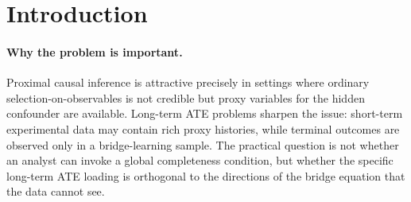 \documentclass[11pt]{article}
\theoremstyle{definition}
\theoremstyle{plain}
\theoremstyle{remark}
\begin{document}
\begin{abstract}
Proximal long-term treatment-effect analyses use negative-control proxies to
solve outcome-bridge equations, but standard point-identification statements
typically impose completeness or rank conditions that make the bridge unique.
Recent proximal work shows that the causal functional may remain identified even
when bridge functions are nonunique, while proxy partial-identification work
studies what happens after completeness is abandoned.  This proposal asks for
the sharp critical boundary between those regimes in a two-sample long-term ATE
setting.  The proposed focal object is the target-active null score
\(\alpha_{\mathrm{LT}}(P)\), the component of the experimental long-term ATE
loading that lies in the null space of the observed bridge operator.  The
headline conjecture is that \(\alpha_{\mathrm{LT}}(P)\) and a finite bridge-LP
support function yield both the exact point-identification frontier and a
local-to-incomplete phase diagram for regularized bridge estimators when the
smallest target-relevant singular values shrink.  If resolved, the result would
tell analysts when a weak or nonunique
proximal bridge still identifies the long-term ATE and when it must be reported
as a sharp proxy-sensitive interval.
\end{abstract}

\section{Introduction}
\paragraph{Why the problem is important.}
Proximal causal inference is attractive precisely in settings where ordinary
selection-on-observables is not credible but proxy variables for the hidden
confounder are available.  Long-term ATE problems sharpen the issue: short-term
experimental data may contain rich proxy histories, while terminal outcomes are
observed only in a bridge-learning sample.  The practical question is not
whether an analyst can invoke a global completeness condition, but whether the
specific long-term ATE loading is orthogonal to the directions of the bridge
equation that the data cannot see.
\end{document}
